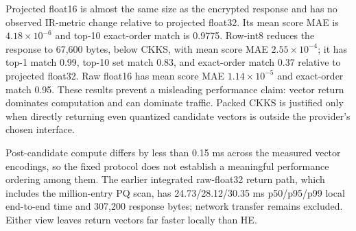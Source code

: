 \documentclass[pdflatex,sn-basic,Numbered]{sn-jnl}
\theoremstyle{plain}
\begin{document}
\begin{table}[t]
\caption{Strong vector-return baselines on 400 frozen $K=100$ test shortlists. Latency starts after candidate selection; for CKKS, projection and PQ time are removed per request before taking quantiles. Response excludes the 800-byte ID request. Vector-return methods disclose exact or near-exact vectors.}\label{tab:return-vector}
\centering
\small
{}
\end{table}

Projected float16 is almost the same size as the encrypted response and has no observed IR-metric change relative to projected float32. Its mean score MAE is $4.18\times10^{-6}$ and top-10 exact-order match is 0.9775. Row-int8 reduces the response to 67,600 bytes, below CKKS, with mean score MAE $2.55\times10^{-4}$; it has top-1 match 0.99, top-10 set match 0.83, and exact-order match 0.37 relative to projected float32. Raw float16 has mean score MAE $1.14\times10^{-5}$ and exact-order match 0.95. These results prevent a misleading performance claim: vector return dominates computation and can dominate traffic. Packed CKKS is justified only when directly returning even quantized candidate vectors is outside the provider's chosen interface.

Post-candidate compute differs by less than 0.15 ms across the measured vector encodings, so the fixed protocol does not establish a meaningful performance ordering among them. The earlier integrated raw-float32 return path, which includes the million-entry PQ scan, has 24.73/28.12/30.35 ms p50/p95/p99 local end-to-end time and 307,200 response bytes; network transfer remains excluded. Either view leaves return vectors far faster locally than HE.
\end{document}
